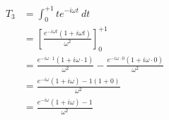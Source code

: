 \documentclass[preview]{standalone}
\begin{document}
\begin{align*}
T_{3}&= \int_{0}^{+1}t e^{-i\omega t} \ dt \\ &=\left[\frac{e^{-i\omega t}(1+i\omega t)}{\omega^{2}}\right]_{0}^{+1} \\ &=\frac{e^{-i\omega\cdot 1}(1+i\omega\cdot 1)}{\omega^{2}}-\frac{e^{-i\omega\cdot 0}(1+i\omega\cdot 0)}{\omega^{2}} \\ &=\frac{e^{-i\omega}(1+i\omega)-1(1+0)}{\omega^{2}} \\ &= \frac{e^{-i\omega}(1+i\omega)-1}{\omega^{2}}
\end{align*}
\end{document}
